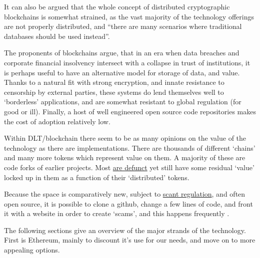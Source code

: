 It can also be argued that the whole concept of distributed cryptographic blockchains is somewhat strained, as the vast majority of the technology offerings are not properly distributed, and ``there are many scenarios where traditional databases should be used instead''\cite{casino2019systematic}.\par
The proponents of blockchains argue, that in an era when data breaches and corporate financial insolvency intersect with a collapse in trust of institutions, it is perhaps useful to have an alternative model for storage of data, and value. Thanks to a natural fit with strong encryption, and innate resistance to censorship by external parties, these systems do lend themselves well to `borderless' applications, and are somewhat resistant to global regulation (for good or ill). Finally, a host of well engineered open source code repositories makes the cost of adoption relatively low.\par
Within DLT/blockchain there seem to be as many opinions on the value of the technology as there are implementations. There are thousands of different `chains' and many more tokens which represent value on them. A majority of these are code forks of earlier projects. Most \href{https://99bitcoins.com/deadcoins/}{are defunct} yet still have some residual `value' locked up in them as a function of their `distributed' tokens. \par 
Because the space is comparatively new, subject to \href{https://www.esma.europa.eu/press-news/consultations/call-evidence-dlt-pilot-regime}{scant regulation}, and often open source, it is possible to clone a github, change a few lines of code, and front it with a website in order to create `scams', and this happens frequently \cite{golumbia2020cryptocurrency}.\par
The following sections give an overview of the major strands of the technology. First is Ethereum, mainly to discount it's use for our needs, and move on to more appealing options.
